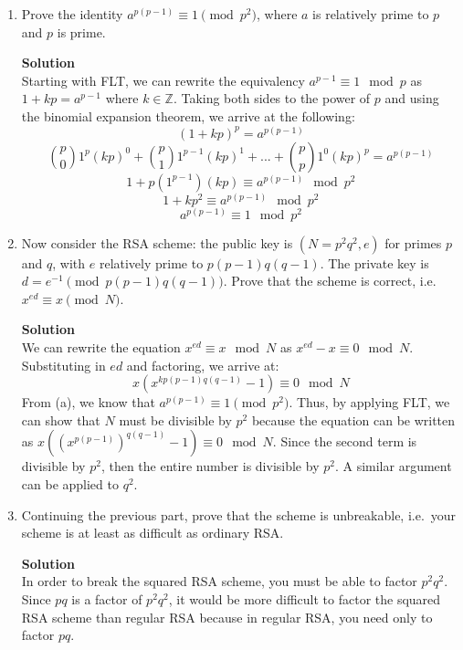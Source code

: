 \documentclass[11pt]{article}
\newenvironment{Parts}{\begin{enumerate}[label=(\alph*)]}{\end{enumerate}}
\newcommand*{\Part}{\item}
\newenvironment{Answer}{\vspace{10pt}\begin{mdframed}\textbf{Solution}\\}{\end{mdframed}\vfill\pagebreak[3]}
\newenvironment{Answer}{\vspace{10pt}}{\vfill\pagebreak[3]}
\newcommand*{\Z}{\mathbb{Z}}
\begin{document}
\begin{Parts}
  \Part Prove the identity $a^{p(p-1)} \equiv 1 \pmod{p^2}$, where $a$ is relatively prime to $p$ and $p$ is prime.
  \begin{Answer}
    Starting with FLT, we can rewrite the equivalency $a^{p-1} \equiv 1 \mod p$ as $1+kp=a^{p-1}$ where $k \in \Z$. Taking both sides to the power of $p$ and using the binomial expansion theorem, we arrive at the following: $$(1+kp)^p=a^{p(p-1)}$$ $$\binom{p}{0}1^p(kp)^0+\binom{p}{1}1^{p-1}(kp)^1+...+\binom{p}{p}1^0(kp)^p=a^{p(p-1)}$$
    $$1+p(1^{p-1})(kp) \equiv a^{p(p-1)} \mod p^2$$
    $$1+kp^2 \equiv a^{p(p-1)} \mod p^2$$
    $$a^{p(p-1)} \equiv 1 \mod p^2$$
  \end{Answer}

  \Part 
   Now consider the RSA scheme: the public key is $(N = p^2 q^2, e)$ for primes $p$ and $q$, with $e$ relatively prime to $p(p-1)q(q-1)$. The private key is $d = e^{-1} \pmod{p(p-1)q(q-1)}$.
  Prove that the scheme is correct, i.e.\ $x^{ed} \equiv x \pmod{N}$.
  \begin{Answer}
        We can rewrite the equation $x^{ed} \equiv x \mod N$ as $x^{ed}-x \equiv 0 \mod N$. Substituting in $ed$ and factoring, we arrive at: $$x(x^{kp(p-1)q(q-1)}-1) \equiv 0 \mod N$$ From (a), we know that $a^{p(p-1)} \equiv 1 \pmod{p^2}$. Thus, by applying FLT, we can show that $N$ must be divisible by $p^2$ because the equation can be written as $x((x^{p(p-1)})^{q(q-1)}-1) \equiv 0 \mod N$. Since the second term is divisible by $p^2$, then the entire number is divisible by $p^2$. A similar argument can be applied to $q^2$.
  \end{Answer}

  \Part Continuing the previous part, prove that the scheme is unbreakable, i.e.\ your scheme is at least as difficult as ordinary RSA.
  \begin{Answer}
    In order to break the squared RSA scheme, you must be able to factor $p^2q^2$. Since $pq$ is a factor of $p^2q^2$, it would be more difficult to factor the squared RSA scheme than regular RSA because in regular RSA, you need only to factor $pq$. 
  \end{Answer}

\end{Parts}
\end{document}
